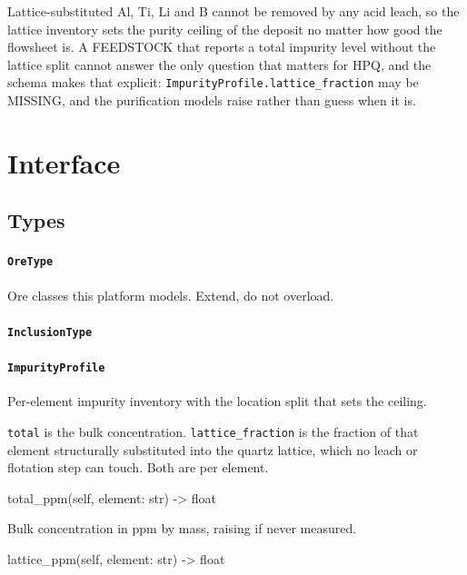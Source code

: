 \documentclass[10pt,a4paper,twoside]{report}
\begin{document}
Lattice-substituted Al, Ti, Li and B cannot be removed by any acid leach, so the lattice inventory sets the purity ceiling of the deposit no matter how good the flowsheet is. A FEEDSTOCK that reports a total impurity level without the lattice split cannot answer the only question that matters for HPQ, and the schema makes that explicit: \texttt{ImpurityProfile.lattice\_fraction} may be MISSING, and the purification models raise rather than guess when it is.

\section{Interface}

\subsection*{Types}

\paragraph{\texttt{OreType}}

Ore classes this platform models. Extend, do not overload.

\paragraph{\texttt{InclusionType}}

\paragraph{\texttt{ImpurityProfile}}

Per-element impurity inventory with the location split that sets the ceiling.

\texttt{total} is the bulk concentration. \texttt{lattice\_fraction} is the fraction of that element structurally substituted into the quartz lattice, which no leach or flotation step can touch. Both are per element.

\begin{verbatimsmall}
total_ppm(self, element: str) -> float
\end{verbatimsmall}

Bulk concentration in ppm by mass, raising if never measured.

\begin{verbatimsmall}
lattice_ppm(self, element: str) -> float
\end{verbatimsmall}
\end{document}
